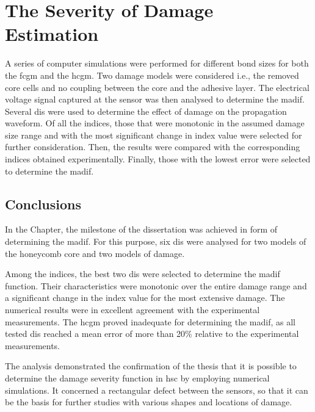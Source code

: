 \chapter[The Severity of Damage Estimation]{The Severity of Damage Estimation}
\label{ch:severity}

A series of computer simulations were performed for different bond sizes for both the \ac{fcgm} and the \ac{hcgm}.
Two damage models were considered i.e., the removed core cells  and no coupling between the core and the adhesive layer.
The electrical voltage signal captured at the sensor was then analysed to determine the \ac{madif}.
Several \acfp{di} were used to determine the effect of damage on the propagation waveform.
Of all the indices, those that were monotonic in the assumed damage size range and with the most significant change in index value were selected for further consideration.
Then, the results were compared with the corresponding indices obtained experimentally.
Finally, those with the lowest error were selected to determine the \ac{madif}.



\clearpage

\section{Conclusions}
\label{sec:conclusionsSever}
In the Chapter, the milestone of the dissertation was achieved in form of determining the \ac{madif}.
For this purpose, six \acp{di} were analysed for two models of the honeycomb core and two models of damage.

Among the indices, the best two \acp{di} were selected to determine the \ac{madif} function.
Their characteristics were monotonic over the entire damage range and a significant change in the index value for the most extensive damage.
The numerical results were in excellent agreement with the experimental measurements.
The \ac{hcgm} proved inadequate for determining the \ac{madif}, as all tested \acp{di} reached a mean error of more than 20\% relative to the experimental measurements.

The analysis demonstrated the confirmation of the thesis that it is possible to determine the damage severity function in \ac{hsc} by employing numerical simulations.
It concerned a rectangular defect between the sensors, so that it can be the basis for further studies with various shapes and locations of damage.